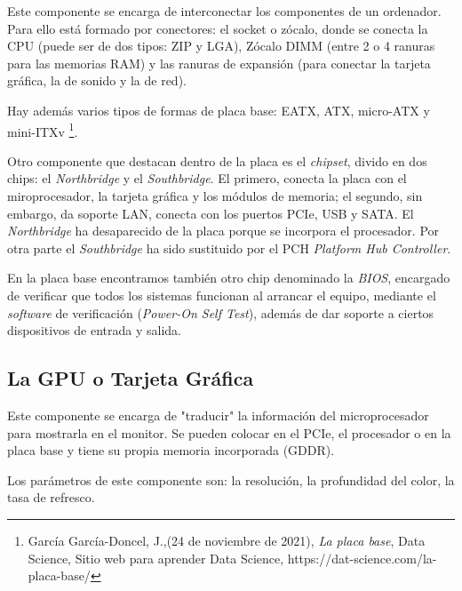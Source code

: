 \documentclass{book}
\begin{document}
\begin{large}

Este componente se encarga de interconectar los componentes de un ordenador. Para ello está formado por conectores: el socket o zócalo, donde se conecta la CPU (puede ser de dos tipos: ZIP y LGA), Zócalo DIMM (entre 2 o 4 ranuras para las memorias RAM) y las ranuras de expansión (para conectar la tarjeta gráfica, la de sonido y la de red).

Hay además varios tipos de formas de placa base: EATX, ATX, micro-ATX y mini-ITXv \footnote{\normalsize García García-Doncel, J.,(24 de noviembre de 2021), \textit{La placa base}, Data Science, Sitio web para aprender Data Science, https://dat-science.com/la-placa-base/}.

Otro componente que destacan dentro de la placa es el \textit{chipset}, divido en dos chips: el  \textit{Northbridge} y el \textit{Southbridge}. El primero, conecta la placa con el miroprocesador, la tarjeta gráfica y los módulos de memoria; el segundo, sin embargo, da soporte LAN, conecta con los puertos PCIe, USB y SATA. El \textit{Northbridge} ha desaparecido de la placa porque se incorpora el procesador. Por otra parte el \textit{Southbridge} ha sido sustituido por el PCH \textit{Platform Hub Controller}.

En la placa base encontramos también otro chip denominado la  \textit{BIOS}, encargado de verificar que todos los sistemas funcionan al arrancar el equipo, mediante el \textit{software} de verificación (\textit{Power-On Self Test}), además de dar soporte a ciertos dispositivos de entrada y salida. 

\end{large}

\subsection{\textbf{La GPU o Tarjeta Gráfica}}

\begin{large}
Este componente se encarga de "traducir" la información del microprocesador para mostrarla en el monitor.
Se pueden colocar en el PCIe, el procesador o en la placa base y tiene su propia memoria incorporada (GDDR).

Los parámetros de este componente son: la resolución, la profundidad del color, la tasa de refresco.

\end{large}
\end{document}
